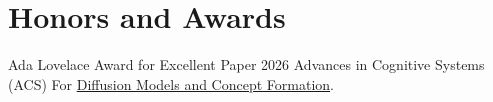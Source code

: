 \section{Honors and Awards}
\CVEntry
  {Ada Lovelace Award for Excellent Paper}
  {2026}
  {Advances in Cognitive Systems (ACS)}
For \href{https://arxiv.org/abs/2609.13047}{Diffusion Models and Concept Formation}.\par
\CVGap
